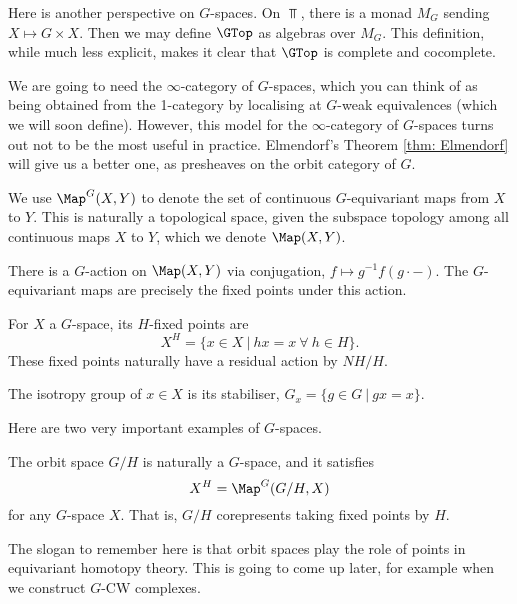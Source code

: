 \begin{remark}
    Here is another perspective on $G$-spaces. On $\Top$, there is a monad $M_G$ sending $X \mapsto G \times X$. Then we may define $\GTop$ as algebras over $M_G$. This definition, while much less explicit, makes it clear that $\GTop$ is complete and cocomplete.
\end{remark}

We are going to need the $\infty$-category of $G$-spaces, which you can think of as being obtained from the 1-category by localising at $G$-weak equivalences (which we will soon define). However, this model for the $\infty$-category of $G$-spaces turns out not to be the most useful in practice. Elmendorf's Theorem \ref{thm: Elmendorf} will give us a better one, as presheaves on the orbit category of $G$.

\begin{ntn} We use $\Map^G(X, Y)$ to denote the set of continuous $G$-equivariant maps from $X$ to $Y$. This is naturally a topological space, given the subspace topology among all continuous maps $X$ to $Y$, which we denote $\Map(X, Y)$. 
\end{ntn}

There is a $G$-action on $\Map(X, Y)$ via conjugation, $f \mapsto g^{-1}f(g \cdot -)$. The $G$-equivariant maps are precisely the fixed points under this action.

\begin{defn} For $X$ a $G$-space, its $H$-fixed points are 
    \[X^H = \{x \in X~|~ hx = x ~\forall~ h \in H\}.\] 
    These fixed points naturally have a residual action by $NH/H$. 
\end{defn}

\begin{defn} 
    The isotropy group of $x \in X$ is its stabiliser, $G_x = \{g \in G ~|~ gx = x\}$.
\end{defn}

Here are two very important examples of $G$-spaces.

\begin{example}
    The orbit space $G/H$ is naturally a $G$-space, and it satisfies
    \[X^H = \Map^G(G/H, X)\]
    for any $G$-space $X$. That is, $G/H$ corepresents taking fixed points by $H$. 
\end{example}

The slogan to remember here is that orbit spaces play the role of points in equivariant homotopy theory. This is going to come up later, for example when we construct $G$-CW complexes. 

